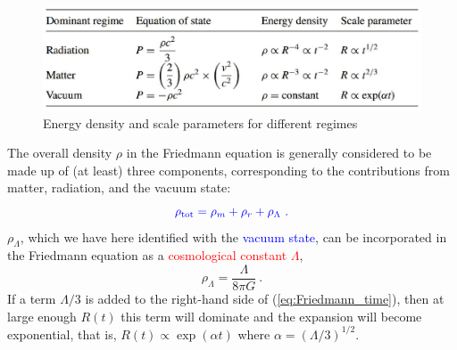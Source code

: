 \documentclass[12pt,a4paper]{article}
\begin{document}
\begin{figure}
\centering
\includegraphics[height=4.cm,angle=0]{rho_R_evo.eps}
\caption{Energy density and scale parameters for different regimes} 
\label{fig:rho_R_evo}
\end{figure}

The overall density $\rho$ in the Friedmann equation is generally considered to  be made up of (at least) three components, corresponding to the contributions from matter, radiation, and the vacuum state:
\begin{equation}
\color{blue} \rho_{\rm tot} = \rho_{m} +\rho_r +\rho_\Lambda ~.
\end{equation}
$\rho_\Lambda$, which we have here identified with the \textcolor{blue}{vacuum state}, can be incorporated in the Friedmann equation as a \textcolor{red}{cosmological constant $\Lambda$},
\begin{equation}
\rho_\Lambda = \dfrac{\Lambda}{8\pi G} ~.
\end{equation}
If a term $\Lambda/3$ is added to the right-hand side of (\ref{eq:Friedmann_time}), then at large enough $R(t)$ this term will dominate and the expansion will become exponential, that is, $R(t) \propto \exp(\alpha t)$ where $\alpha = (\Lambda/3)^{1/2}$.
\end{document}
